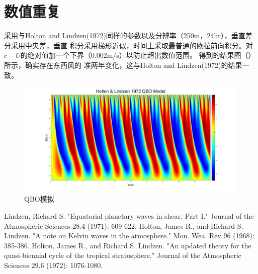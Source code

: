 \documentclass[UTF8]{ctexart}
\begin{document}
	\section{数值重复}
	采用与Holton and Lindzen(1972)\cite{main}同样的参数以及分辨率（250m，24hr），垂直差分采用中央差，垂直
	积分采用梯形近似，时间上采取最普通的欧拉前向积分。对$c-U$的绝对值加一个下界（0.002m/s）以防止超出数值范围。
	得到的结果图（）所示，确实存在东西风的
	准两年变化，这与Holton and Lindzen(1972)\cite{main}的结果一致。
	\begin{figure}[H]
		\centering
		\includegraphics[height =.3\textheight]{qbo.png}
		\caption{QBO模拟}
		\label{fig:delta18000}
	\end{figure}
	
	
	

\begin{thebibliography}{99}
	 Lindzen, Richard S. "Equatorial planetary waves in shear. Part I." Journal of the Atmospheric Sciences 28.4 (1971): 609-622.
	 Holton, James R., and Richard S. Lindzen. "A note on Kelvin waves in the atmosphere." Mon. Wea. Rev 96 (1968): 385-386.
	 Holton, James R., and Richard S. Lindzen. "An updated theory for the quasi-biennial cycle of the tropical stratosphere." Journal of the Atmospheric Sciences 29.6 (1972): 1076-1080.
\end{thebibliography}
\end{document}
